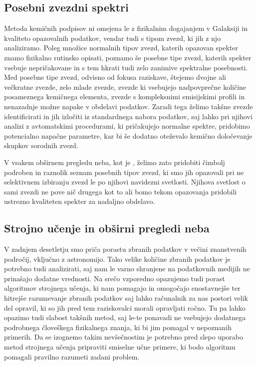 \subsection{Posebni zvezdni spektri}
Metoda kemičnih podpisov ni omejena le z fizikalnim dogajanjem v Galaksiji in kvaliteto opazovalnih podatkov, vendar tudi s tipom zvezd, ki jih z njo analiziramo. Poleg množice normalnih tipov zvezd, katerih opazovan spekter znamo fizikalno rutinsko opisati, poznamo še posebne tipe zvezd, katerih spekter vsebuje nepričakovane in s tem hkrati tudi zelo zanimive spektralne posebnosti. Med posebne tipe zvezd, odvisno od fokusa raziskave, štejemo dvojne ali večkratne zvezde, zelo mlade zvezde, zvezde ki vsebujejo nadpovprečne količine posameznega kemičnega elementa, zvezde s kompleksnimi emisijskimi profili in nenazadnje možne napake v obdelavi podatkov. Zaradi tega želimo takšne zvezde identificirati in jih izločiti iz standardnega nabora podatkov, saj lahko pri njihovi analizi z avtomatskimi procedurami, ki pričakujejo normalne spektre, pridobimo potencialno napačne parametre, kar bi še dodatno oteževalo kemično določevanje skupkov sorodnih zvezd.

V vsakem obširnem pregledu neba, kot je \Gh, želimo zato pridobiti čimbolj podroben in raznolik seznam posebnih tipov zvezd, ki smo jih opazovali pri ne selektivnem izbiranju zvezd le po njihovi navidezni svetlosti. Njihova svetlost o sami zvezdi ne pove nič drugega kot to ali bomo tekom opazovanja pridobili ustrezno kvaliteten spekter za nadaljno obdelavo.

\subsection{Strojno učenje in obširni pregledi neba}
V zadnjem desetletju smo priča porastu zbranih podatkov v večini znanstvenih področij, vključno z astronomijo. Tako velike količine zbranih podatkov je potrebno tudi analizirati, saj nam le varno shranjene na podatkovnih medijih ne prinašajo dodatne vrednosti. Na srečo vzporedno opazujemo tudi porast algoritmov strojnega učenja, ki nam pomagajo in omogočajo enostavnejše ter hitrejše razumevanje zbranih podatkov saj lahko računalnik za nas postori velik del opravil, ki so jih pred tem raziskovalci morali opravljati ročno. Tu pa lahko opazimo tudi slabost takšnih metod, saj le-te ponavadi ne vsebujejo dodatnega podrobnega človeškega fizikalnega znanja, ki bi jim pomagal v nepoznanih primerih. Da se izognemo takim nevšečnostim je potrebno pred slepo uporabo metod strojnega učenja pripraviti smiselne učne primere, ki bodo algoritmu pomagali pravilno razumeti zadani problem.

